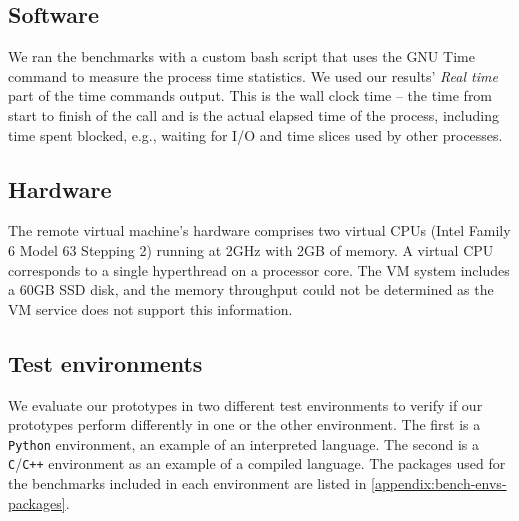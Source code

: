 \subsection{Software}
We ran the benchmarks with a custom bash script that uses the GNU Time command to measure the process time statistics. We used our results' \emph{Real time} part of the time commands output. This is the wall clock time -- the time from start to finish of the call and is the actual elapsed time of the process, including time spent blocked, e.g., waiting for I/O and time slices used by other processes.
\subsection{Hardware}
The remote virtual machine's hardware comprises two virtual CPUs (Intel Family 6 Model 63 Stepping 2) running at 2GHz with 2GB of memory. A virtual CPU corresponds to a single hyperthread on a processor core. The VM system includes a 60GB SSD disk, and the memory throughput could not be determined as the VM service does not support this information. 

\subsection{Test environments}\label{test-environments}
We evaluate our prototypes in two different test environments to verify if our prototypes perform differently in one or the other environment. The first is a \verb|Python| environment, an example of an interpreted language. The second is a \verb|C|/\verb|C++| environment as an example of a compiled language. The packages used for the benchmarks included in each environment are listed in \ref{appendix:bench-envs-packages}.